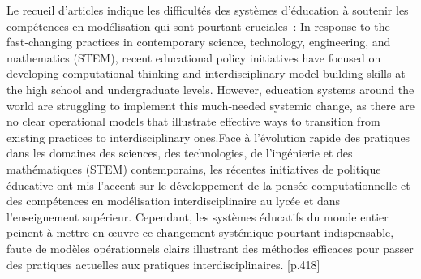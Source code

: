 {Le recueil d'articles  indique les difficultés des systèmes d'éducation à soutenir les compétences en modélisation qui sont pourtant cruciales~:
\quoteenfr
{In response to the fast‐changing practices in contemporary science, technology, engineering, and mathematics (STEM), recent educational policy initiatives have focused on developing computational thinking and interdisciplinary model‐building skills at the high school and undergraduate levels. However, education systems around the world are struggling to implement this much‐needed systemic change, as there are no clear operational models that illustrate effective ways to transition from existing practices to interdisciplinary ones.}{Face à l'évolution rapide des pratiques dans les domaines des sciences, des technologies, de l'ingénierie et des mathématiques (STEM) contemporains, les récentes initiatives de politique éducative ont mis l'accent sur le développement de la pensée computationnelle et des compétences en modélisation interdisciplinaire au lycée et dans l'enseignement supérieur. Cependant, les systèmes éducatifs du monde entier peinent à mettre en œuvre ce changement systémique pourtant indispensable, faute de modèles opérationnels clairs illustrant des méthodes efficaces pour passer des pratiques actuelles aux pratiques interdisciplinaires.}
{[p.418]}
}{}

